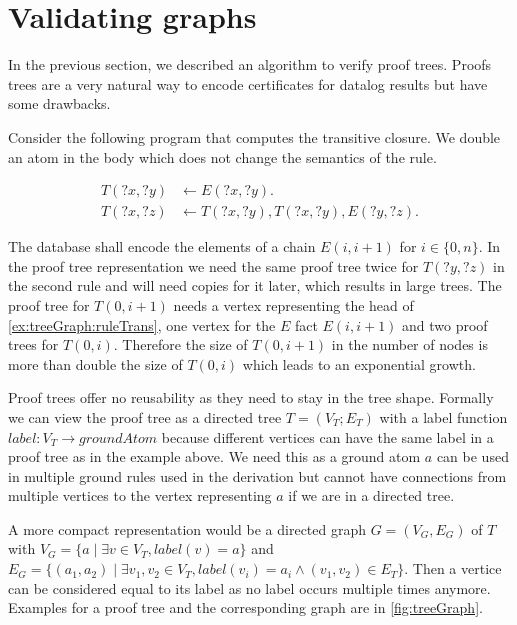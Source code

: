 \section{Validating graphs}\label{sec:valGraph}

In the previous section, we described an algorithm to verify proof trees. Proofs trees are a very natural way to encode certificates for datalog results but have some drawbacks. 

\begin{example}\label{ex:treeGraph}
    Consider the following program that computes the transitive closure. We double an atom in the body which does not change the semantics of the rule. 

    \begin{align}
            T(?x,?y) &\leftarrow E(?x,?y). \label{ex:treeGraph:ruleBase}\\
            T(?x,?z) &\leftarrow T(?x, ?y), T(?x, ?y), E(?y, ?z). \label{ex:treeGraph:ruleTrans}
    \end{align}

    The database shall encode the elements of a chain $E(i, i+1)$ for $i \in \{0, n\}$. In the proof tree representation we need the same proof tree twice for $T(?y, ?z)$ in the second rule and will need copies for it later, which results in large trees. The proof tree for $T(0, i+1)$ needs a vertex representing the head of \cref{ex:treeGraph:ruleTrans}, one vertex for the $E$ fact $E(i, i+1)$ and two proof trees for $T(0, i)$. Therefore the size of $T(0, i+1)$ in the number of nodes is more than double the size of $T(0, i)$ which leads to an exponential growth.
\end{example}

Proof trees offer no reusability as they need to stay in the tree shape. Formally we can view the proof tree as a directed tree $T= (V_T;E_T)$ with a label function $label: V_T \to groundAtom$ because different vertices can have the same label in a proof tree as in the example above. We need this as a ground atom $a$ can be used in multiple ground rules used in the derivation but cannot have connections from multiple vertices to the vertex representing $a$ if we are in a directed tree.

A more compact representation would be a directed graph $G=(V_G, E_G)$ of $T$  with $V_G = \{a \mid \exists v \in V_T, label(v)=a\}$ and $E_G = \{ (a_1, a_2) \mid \exists v_1, v_2 \in V_T,  label(v_i) = a_i \land (v_1, v_2) \in E_T\}$. Then a vertice can be considered equal to its label as no label occurs multiple times anymore. Examples for a proof tree and the corresponding graph are in \cref{fig:treeGraph}.


